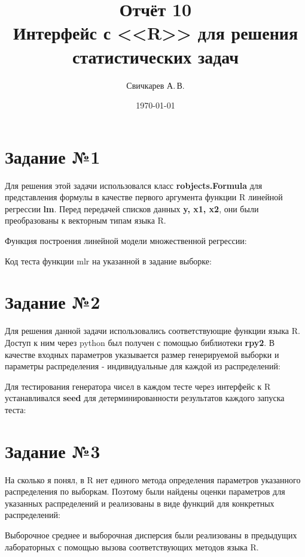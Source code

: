 \documentclass{article} %
\title{Отчёт 10\protect\\Интерфейс с <<R>> для решения статистических задач} %
\author{Свичкарев А.\,В.} %
\date{\today} %
\begin{document}

\maketitle %

\section{Задание №1}
Для решения этой задачи использовался класс \textbf{robjects.Formula} для представления формулы в качестве первого аргумента функции R линейной регрессии \textbf{lm}. Перед передачей списков данных \textbf{y, x1, x2}, они были преобразованы к векторным типам языка R.

Функция построения линейной модели множественной регрессии:


Код теста функции mlr на указанной в задание выборке:


\newpage
\section{Задание №2}
Для решения данной задачи использовались соответствующие функции языка R. Доступ к ним через python был получен с помощью библиотеки \textbf{rpy2}. В качестве входных параметров указывается размер генерируемой выборки и параметры распределения - индивидуальные для каждой из распределений:


Для тестирования генератора чисел в каждом тесте через интерфейс к R устанавливался \textbf{seed} для детерминированности результатов каждого запуска теста:


\newpage
\section{Задание №3}
На сколько я понял, в R нет единого метода определения параметров указанного распределения по выборкам. Поэтому были найдены оценки параметров для указанных распределений и реализованы в виде функций для конкретных распределений:


Выборочное среднее и выборочная дисперсия были реализованы в предыдущих лабораторных с помощью вызова соответствующих методов языка R.
\end{document}
